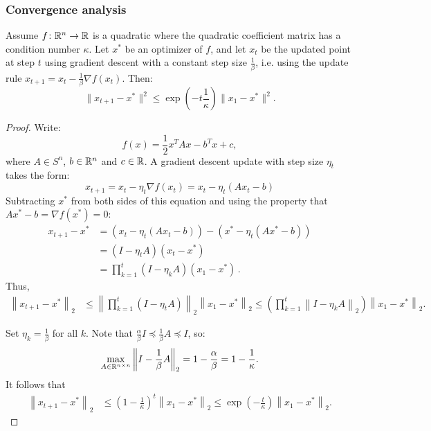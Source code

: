 \subsubsection{Convergence analysis}

\begin{theorem}
Assume $f\colon\mathbb{R}^n\to\mathbb{R}$ is a quadratic where the quadratic coefficient matrix has a condition number $\kappa$. Let $x^{*}$ be an optimizer of $f$, and let $x_{t}$ be the updated point at step $t$ using gradient descent with a constant step size $\frac{1}{\beta}$, i.e. using the update rule $x_{t+1} = x_t - \frac{1}{\beta}\nabla f(x_t)$. Then:
\begin{equation*}
\|x_{t+1} - x^*\|^2 \leq \exp\left(-t \frac{1}{\kappa}\right)\|x_1 - x^*\|^2.
\end{equation*}
\end{theorem}
\begin{proof}
Write:
\[
f(x) = \frac{1}{2}x^T A x - b^T x + c,
\]
where $A \in S^n$, $b \in \mathbb{R}^n$ and $c \in \mathbb{R}$. A gradient descent update with step size $\eta_t$ takes the form:
\[
x_{t+1} = x_t - \eta_t \nabla f(x_t) = x_t - \eta_t \left(Ax_t - b\right)
\]
Subtracting $x^*$ from both sides of this equation and using the property that $Ax^* - b = \nabla f(x^*) = 0$:
\begin{align*}
x_{t+1} - x^* &= \left(x_t - \eta_t\left(Ax_t - b\right)\right) - \left(x^* - \eta_t\left(Ax^* - b\right)\right) \\
&= (I - \eta_t A)(x_t - x^*)\\
&= \prod_{k=1}^t (I-\eta_k A)(x_1-x^*)\,.
\end{align*}
Thus,
\begin{align*}
\left\|x_{t+1} - x^*\right\|_2 &\leq \left\|\prod_{k=1}^t(I - \eta_t
A)\right\|_2 \left\|x_1 - x^*\right\|_2
\leq \left(\prod_{k=1}^t \left\| I - \eta_k A\right\|_2\right) \left\|x_1 - x^*\right\|_2.
\end{align*}

Set $\eta_k = \frac{1}{\beta}$ for all $k$. Note that $\frac{\alpha}{\beta}I \preceq \frac{1}{\beta}A \preceq I$, so:
\begin{equation*}
\max_{A \in \mathbb{R}^{n\times n}} \left\|I - \frac{1}{\beta} A\right \|_2 = 1 - \frac{\alpha}{\beta} = 1 - \frac{1}{\kappa}.
\end{equation*}
It follows that
\begin{align*}
\left\|x_{t+1} - x^*\right\|_2 &\leq \left(1 - \frac{1}{\kappa}\right)^t \left\|x_1 - x^*\right\|_2 
\leq \exp \left(-\frac{t}{\kappa}\right) \left\|x_1 - x^*\right\|_2.
\end{align*}
\end{proof}

